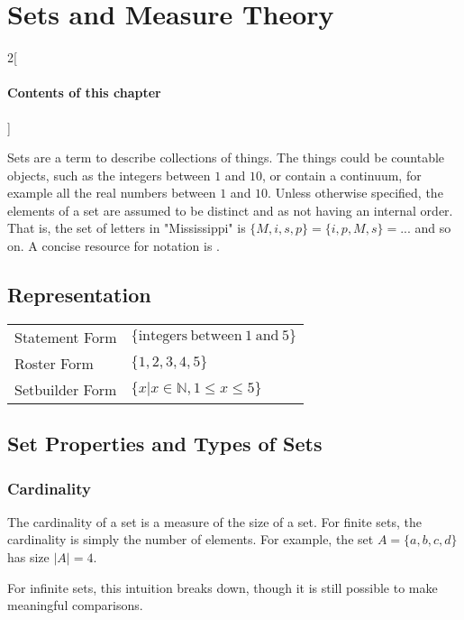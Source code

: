 \chapter{Sets and Measure Theory	}

\begin{multicols}{2}[\subsubsection*{Contents of this chapter}]
\end{multicols}



Sets are a term to describe collections of things. The things could be countable objects, such as the integers between $1$ and $10$, or contain a continuum, for example all the real numbers between $1$ and $10$. Unless otherwise specified, the elements of a set are assumed to be distinct and as not having an internal order. That is, the set of letters in "Mississippi" is $\{M,i,s,p \} = \{i,p,M,s 	\} = ... $ and so on. A concise resource for notation is . 


\section{Representation}

\begin{tabular}{ll}
Statement Form & $\{\mathrm{integers\ between\ 1\ and\ 5}\}$\\
Roster Form & $\{1,2,3,4,5\}$ \\
Setbuilder Form & $\{x|x\in\mathbb{N}, 1\leq x \leq 5 \} $
\end{tabular}


\section{Set Properties and Types of Sets}

\subsection{Cardinality}
The cardinality of a set is a measure of the size of a set. For finite sets, the cardinality is simply the number of elements. For example, the set  $A = \{a,b,c,d\}$ has size $|A|=4$.

For infinite sets, this intuition breaks down, though it is still possible to make meaningful comparisons. 

